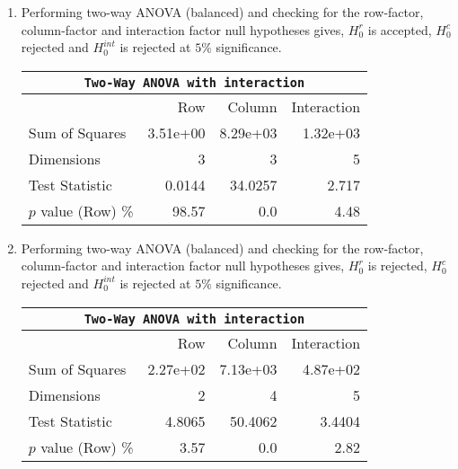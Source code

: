 \begin{enumerate}
\begin{table}[H]
		\bigskip
	\end{table}
	
	\item Performing two-way ANOVA (balanced) and checking for the row-factor, column-factor and interaction factor null hypotheses gives,
	$ H_0^r $ is accepted, $ H_0^c $ rejected and $ H_0^{int} $ is rejected at $ 5\% $ significance.
	
	\begin{table}[H]
		\centering
		\begin{tabular}{@{}lrrr@{}}
			\toprule
			\multicolumn{4}{c}{\texttt{Two-Way ANOVA with interaction}}\\ 
			\midrule
			{} &       Row &    Column & Interaction \\
			\midrule
			Sum of Squares     &  3.51e+00 &  8.29e+03 &    1.32e+03 \\
			Dimensions         &         3 &         3 &           5 \\
			Test Statistic     &    0.0144 &   34.0257 &       2.717 \\
			$p$ value (Row) \% &     98.57 &       0.0 &        4.48 \\
			\bottomrule
		\end{tabular}
		
		\bigskip
	\end{table}

	\item Performing two-way ANOVA (balanced) and checking for the row-factor, column-factor and interaction factor null hypotheses gives,
	$ H_0^r $ is rejected, $ H_0^c $ rejected and $ H_0^{int} $ is rejected at $ 5\% $ significance.
	
	\begin{table}[H]
		\centering
		\begin{tabular}{@{}lrrr@{}}
			\toprule
			\multicolumn{4}{c}{\texttt{Two-Way ANOVA with interaction}}\\ 
			\midrule
			{} &       Row &    Column & Interaction \\
			\midrule
			Sum of Squares     &  2.27e+02 &  7.13e+03 &    4.87e+02 \\
			Dimensions         &         2 &         4 &           5 \\
			Test Statistic     &    4.8065 &   50.4062 &      3.4404 \\
			$p$ value (Row) \% &      3.57 &       0.0 &        2.82 \\
			\bottomrule
		\end{tabular}
		

\end{table}
\end{enumerate}
